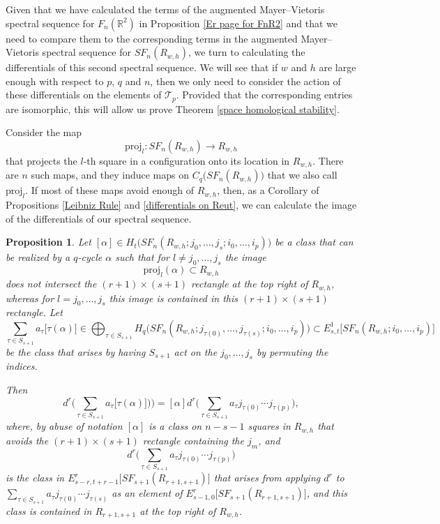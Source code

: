 \documentclass[pagebackref,colorlinks,citecolor=blue,linkcolor=blue,urlcolor=blue,filecolor=blue]{article}
\newtheorem{prop}[thm]{Proposition}
\theoremstyle{definition}\newtheorem{definition}[thm]{Definition}
\theoremstyle{definition}
\newcommand{\R}{\ensuremath{\mathbb{R}}}
\begin{document}
Given that we have calculated the terms of the augmented Mayer--Vietoris spectral sequence for $F_{n}(\R^{2})$ in Proposition \ref{Er page for FnR2} and that we need to compare them to the corresponding terms in the augmented Mayer--Vietoris spectral sequence for $SF_{n}(R_{w,h})$, we turn to calculating the differentials of this second spectral sequence.
We will see that if $w$ and $h$ are large enough with respect to $p$, $q$ and $n$, then we only need to consider the action of these differentials on the elements of $\mathcal{T}_{p}$.
Provided that the corresponding entries are isomorphic, this will allow us prove Theorem \ref{space homological stability}.

Consider the map
\[
\text{proj}_{l}:SF_{n}(R_{w,h})\to R_{w,h}
\]
that projects the $l$-th square in a configuration onto its location in $R_{w,h}$.
There are $n$ such maps, and they induce maps on $C_{q}\big(SF_{n}(R_{w,h})\big)$ that we also call $\text{proj}_{l}$.
If most of these maps avoid enough of $R_{w,h}$, then, as a Corollary of Propositions \ref{Leibniz Rule} and \ref{differentials on Reut}, we can calculate the image of the differentials of our spectral sequence.

\begin{prop}\label{differentials are well defined as long as we have enough space}
Let $[\alpha]\in H_{t}\big(SF_{n}(R_{w,h}; j_{0},\dots, j_{s}; i_{0}, \dots, i_{p})\big)$ be a class that can be realized by a $q$-cycle $\alpha$ such that for $l\neq j_{0}, \dots, j_{s}$ the image
\[
\text{proj}_{l}(\alpha)\subset R_{w,h}
\]
does not intersect the $(r+1)\times (s+1)$ rectangle at the top right of $R_{w,h}$, whereas for $l=j_{0}, \dots,j_{s}$ this image is contained in this $(r+1)\times (s+1)$ rectangle.
Let 
\[
\sum_{\tau\in S_{s+1}}a_{\tau}\big[\tau(\alpha)\big]\in \bigoplus_{\tau\in S_{s+1}}H_{q}\big(SF_{n}(R_{w,h}; j_{\tau(0)},\dots, j_{\tau(s)}; i_{0},\dots, i_{p})\big)\subset E^{1}_{s,t}\big[SF_{n}(R_{w,h};i_{0},\dots, i_{p})\big]
\]
be the class that arises by having $S_{s+1}$ act on the $j_{0}, \dots, j_{s}$ by permuting the indices.

Then
\[
d^{r}\Bigg(\sum_{\tau\in S_{s+1}}a_{\tau}\big[\tau(\alpha)\big])\Bigg)=[\alpha]d^{r}\Bigg(\sum_{\tau\in S_{s+1}}a_{\tau}j_{\tau(0)}\cdots j_{\tau(p)}\Bigg),
\]
where, by abuse of notation $[\alpha]$ is a class on $n-s-1$ squares in $R_{w,h}$ that avoids the $(r+1)\times (s+1)$ rectangle containing the $j_{m}$, and 
\[
d^{r}\Bigg(\sum_{\tau\in S_{s+1}}a_{\tau}j_{\tau(0)}\cdots j_{\tau(p)}\Bigg)
\]
is the class in $E^{r}_{s-r, t+r-1}\big[SF_{s+1}(R_{r+1, s+1})\big]$ that arises from applying $d^{r}$ to $\sum_{\tau\in S_{s+1}}a_{\tau}j_{\tau(0)}\cdots j_{\tau(s)}$ as an element of $E^{r}_{s-1, 0}\big[SF_{s+1}(R_{r+1, s+1})\big]$, and this class is contained in $R_{r+1, s+1}$ at the top right of $R_{w,h}$.
\end{prop}
\end{document}
